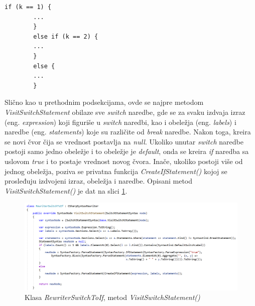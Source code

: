 \documentclass[a4paper]{article}
\begin{document}
{\begin{lstlisting}[caption={\textit{If-else} naredba}, label=lst:ifelse]
		if (k == 1) {
		...
		}
		else if (k == 2) {
		...
		}
		else {
		...
		}
		\end{lstlisting}
		
		
		Slično kao u prethodnim podsekcijama, ovde se najpre metodom \textit{VisitSwitchStatement} obilaze sve \textit{switch} naredbe, gde se za svaku izdvaja izraz (eng. \textit{expression}) koji figuriše u \textit{switch} naredbi, kao i obeležja (eng. \textit{labels}) i naredbe (eng. \textit{statements}) koje su različite od \textit{break} naredbe. Nakon toga, kreira se novi čvor čija se vrednost postavlja na \textit{null}. Ukoliko unutar \textit{switch} naredbe postoji samo jedno obeležje i to obeležje je \textit{default}, onda se kreira \textit{if} naredba sa uslovom \textit{true} i to postaje vrednost novog čvora.
		Inače, ukoliko postoji više od jednog obeležja, poziva se privatna funkcija \textit{CreateIfStatement()} kojoj se prosleđuju izdvojeni izraz, obeležja i naredbe. Opisani metod \textit{VisitSwitchStatement()} je dat na slici \ref{fig:RewriterSwitchToIf_part1}.
		
		
		\begin{figure}[!htb]
			\begin{center}
				\includegraphics[scale=0.44]{images/RewriterSwitchToIf_part1.png}
			\end{center}
			\caption{Klasa \textit{RewriterSwitchToIf}, metod \textit{VisitSwitchStatement()}}
			\label{fig:RewriterSwitchToIf_part1}
		\end{figure}
		
}
\end{document}

